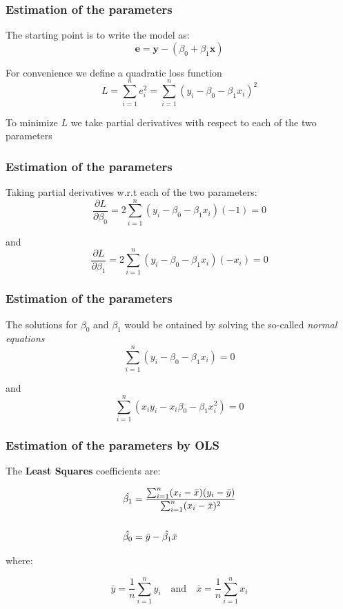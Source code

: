 \documentclass[12pt]{beamer}\usepackage[]{graphicx}\usepackage[]{color}
\begin{document}

\begin{frame}
\frametitle{Estimation of the parameters}

The starting point is to write the model as:
$$
\mathbf{e} = \mathbf{y} - (\beta_0 + \beta_1 \mathbf{x})
$$

For convenience we define a quadratic loss function
$$
L = \sum_{i=1}^{n} e_{i}^{2} = \sum_{i=1}^{n} (y_i - \beta_0 - \beta_1 x_i)^2
$$

To minimize $L$ we take partial derivatives with respect to each of the two parameters

\end{frame}


\begin{frame}
\frametitle{Estimation of the parameters}

Taking partial derivatives w.r.t each of the two parameters:
$$
\frac{\partial L}{\partial \beta_0} = 2 \sum_{i=1}^{n} (y_i - \beta_0 - \beta_1 x_i) (-1) = 0
$$

and
$$
\frac{\partial L}{\partial \beta_1} = 2 \sum_{i=1}^{n} (y_i - \beta_0 - \beta_1 x_i) (-x_i) = 0
$$

\end{frame}


\begin{frame}
\frametitle{Estimation of the parameters}

The solutions for $\beta_0$ and $\beta_1$ would be ontained by solving 
the so-called \textit{normal equations}
$$
\sum_{i=1}^{n} (y_i - \beta_0 - \beta_1 x_i) = 0
$$

and
$$
\sum_{i=1}^{n} (x_i y_i - x_i \beta_0 - \beta_1 x_{i}^{2}) = 0
$$

\end{frame}


\begin{frame}
\frametitle{Estimation of the parameters by OLS}

The \textbf{Least Squares} coefficients are:

\begin{align*}
\hat{\beta_1} &= \frac{\sum_{i=1}^{n} (x_i - \bar{x})(y_i - \bar{y})}{\sum_{i=1}^{n} (x_i - \bar{x})^2} \\
\vspace{5mm} \\
\hat{\beta_0} &= \bar{y} - \hat{\beta_1} \bar{x} 
\end{align*}

where:

$$
\bar{y} = \frac{1}{n} \sum_{i=1}^{n} y_i \quad \text{and} 
\quad \bar{x} = \frac{1}{n} \sum_{i=1}^{n} x_i
$$

\end{frame}
\end{document}
